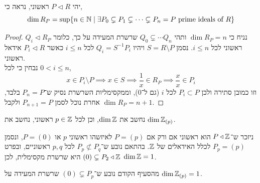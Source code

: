 \subquestion{}
יהי $P \triangleleft R$ ראשוני, נראה כי,
\[
	\dim R_P
	= \sup\{ n \in \mathbb{N} \mid \exists P_0 \subsetneq P_1 \subsetneq \cdots \subsetneq P_n = P \text{ prime ideals of } R \}
\]
\begin{proof}
	נניח כי $\dim R_P = n$ ותהי $Q_0 \subsetneq \cdots Q_n$ שרשרת המעידה על כך, כלומר $Q_i \triangleleft R_P$ ראשוני לכל $i \le n$.
	נסמן $S = R \setminus P$ ויהיו $Q_i = S^{-1} P_i$ לכל $i \le n$ כאשר $P_i \triangleleft R$ אידאל ראשוני. \\
	נבחין כי לכל $0 < i \le n$,
	\[
		x \in P_i \setminus P
		\implies x \in S
		\implies \frac{1}{x} \in R_P
		\implies \frac{x}{x} \in P_i
	\]
	וזו כמובן סתירה ולכן $P_i \subset P$ לכל $i$ (גם ל־$0$), וממקסימליות השרשרת נסיק ש־$P_n = P$ בלבד, אחרת נוכל לסמן $P_{n + 1} = P$ ולקבל $\dim R_P = n + 1$.
\end{proof}

\subquestion{}
נחשב את $\dim \mathbb{Z}$, וכן לכל $p \in \mathbb{Z}$ ראשוני, נחשב את $\dim \mathbb{Z}_{(p)}$.
\begin{solution}
	ניזכר ש־$P \triangleleft \mathbb{Z}$ הוא ראשוני אם ורק אם $P = (p)$ לאיזשהו ראשוני $p$ או $P = (0)$, ונסמן $P_p = (p)$ לכלל האידאלים של $\mathbb{Z}$.
	בהתאם נובע ש־$P_p \not\subset P_q$ לכל $p, q$ ראשוניים, ובפרט $(0) \subsetneq P_2 \triangleleft \mathbb{Z}$ היא שרשרת מקסימלית, לכן $\dim \mathbb{Z} = 1$.

	מהסעיף הקודם נובע ש־$(0) \subsetneq P_p$ שרשרת המעידה על $\dim \mathbb{Z}_{(p)} = 1$.
\end{solution}



